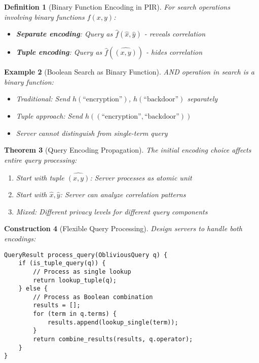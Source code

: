 \documentclass[11pt,final]{article}
\newtheorem{theorem}{Theorem}[section]
\newtheorem{definition}[theorem]{Definition}
\newtheorem{example}[theorem]{Example}
\newtheorem{construction}[theorem]{Construction}
\begin{document}
\begin{definition}[Binary Function Encoding in PIR]
For search operations involving binary functions $f(x,y)$:
\begin{itemize}
    \item \textbf{Separate encoding}: Query as $\hat{f}(\hat{x}, \hat{y})$ - reveals correlation
    \item \textbf{Tuple encoding}: Query as $\hat{f}(\widehat{(x,y)})$ - hides correlation
\end{itemize}
\end{definition}

\begin{example}[Boolean Search as Binary Function]
AND operation in search is a binary function:
\begin{itemize}
    \item Traditional: Send $h(\text{``encryption''})$, $h(\text{``backdoor''})$ separately
    \item Tuple approach: Send $h((\text{``encryption''}, \text{``backdoor''}))$
    \item Server cannot distinguish from single-term query
\end{itemize}
\end{example}

\begin{theorem}[Query Encoding Propagation]
The initial encoding choice affects entire query processing:
\begin{enumerate}
    \item Start with tuple $\widehat{(x,y)}$: Server processes as atomic unit
    \item Start with $\hat{x}, \hat{y}$: Server can analyze correlation patterns
    \item Mixed: Different privacy levels for different query components
\end{enumerate}
\end{theorem}

\begin{construction}[Flexible Query Processing]
Design servers to handle both encodings:
\begin{verbatim}
QueryResult process_query(ObliviousQuery q) {
    if (is_tuple_query(q)) {
        // Process as single lookup
        return lookup_tuple(q);
    } else {
        // Process as Boolean combination
        results = [];
        for (term in q.terms) {
            results.append(lookup_single(term));
        }
        return combine_results(results, q.operator);
    }
}
\end{verbatim}
\end{construction}
\end{document}
